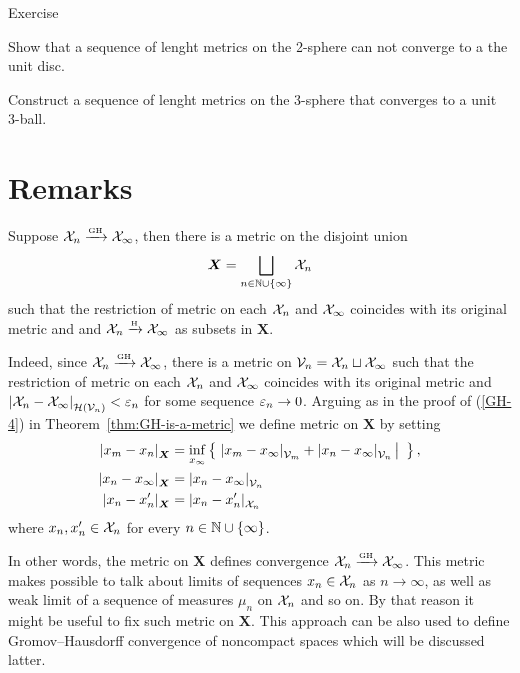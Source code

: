 \begin{thm}{Exercise}\label{ex:sphere-to-ball}
\begin{subthm}{}
Show that a sequence of lenght metrics on the 2-sphere can not converge to a the unit disc.
\end{subthm}

\begin{subthm}{}
Construct a sequence of lenght metrics on the 3-sphere that converges to a unit 3-ball.
\end{subthm}

\end{thm}

\section{Remarks}

Suppose $\mathcal{X}_n\xrightarrow{\mbox{\tiny GH}} \mathcal{X}_\infty$, then there is a metric on the disjoint union 
\[\bm{X}=\bigsqcup_{n\in \mathbb{N}\cup\{\infty\}} \mathcal{X}_n\]
such that the restriction of metric on each $\mathcal{X}_n$ and $\mathcal{X}_\infty$ coincides with its original metric and and $\mathcal{X}_n\xrightarrow{\mbox{\tiny H}} \mathcal{X}_\infty$ as subsets in $\bm{X}$.

Indeed, since $\mathcal{X}_n\xrightarrow{\mbox{\tiny GH}} \mathcal{X}_\infty$, there is a metric on $\mathcal{V}_n=\mathcal{X}_n\sqcup \mathcal{X}_\infty$ such that the restriction of metric on each $\mathcal{X}_n$ and $\mathcal{X}_\infty$ coincides with its original metric and $\dist{\spc{X}_n}{\spc{X}_\infty}{\mathcal{H}(\spc{V}_n)}<\eps_n$ for some sequence $\varepsilon_n\to 0$.
Arguing as in the proof of (\ref{GH-4}) in Theorem~\ref{thm:GH-is-a-metric}
we define metric on $\bm{X}$ by setting 
\begin{align*}
\dist{x_m}{x_n}{\bm{X}}&=\inf_{x_\infty}\set{\dist{x_m}{x_\infty}{\spc{V}_m}+\dist{x_n}{x_\infty}{\spc{V}_n}}{},
\\
\dist{x_n}{x_\infty}{\bm{X}}&=\dist{x_n}{x_\infty}{\spc{V}_n}
\\
\dist{x_n}{x'_n}{\bm{X}}&=\dist{x_n}{x_n'}{\spc{X}_n}
\end{align*}
where $x_n,x_n'\in\mathcal{X}_n$ for every $n\in \mathbb{N}\cup\{\infty\}$.

In other words, the metric on $\bm{X}$ defines convergence $\mathcal{X}_n\xrightarrow{\mbox{\tiny GH}} \mathcal{X}_\infty$.
This metric makes possible to talk about limits of sequences $x_n\in \mathcal{X}_n$ as $n\to\infty$, as well as weak limit of a sequence of measures $\mu_n$ on $\mathcal{X}_n$ and so on.
By that reason it might be useful to fix such metric on $\bm{X}$.
This approach can be also used to define Gromov--Hausdorff convergence of noncompact spaces which will be discussed latter.

